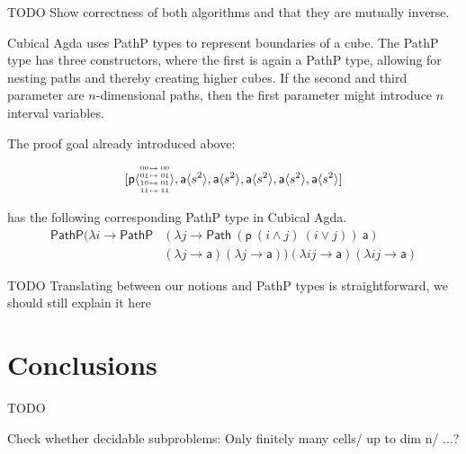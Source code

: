 \documentclass{llncs}
\makeatletter
\newcommand{\continuation}{??}
\newenvironment{examplecontd}[1]
{
  \renewcommand{\continuation}{\ref{#1}}\expcont[continued]
}
{\endexpcont}
\newcommand{\todo}[1]{
  \begin{tcolorbox}
    TODO {#1} 
  \end{tcolorbox}
}
\newcommand{\mlist}[1]{[ {#1} ]}
\newcommand{\smap}[1]{s^{{#1}}}
\newcommand{\cont}[2]{\ensuremath{ \ifthenelse{\equal{#2}{}}{#1}{{#1}\langle{#2}\rangle}} }
\newcommand{\cset}[1]{\ensuremath{\mathsf{{#1}}}}
\newcommand{\substfour}[4]{\tiny
  \arraycolsep=.4pt\def\arraystretch{1}
  \begin{array}{ll}
    00 &\mapsto {#1} \\
    01 &\mapsto {#2} \\
    10 &\mapsto {#3} \\
    11 &\mapsto {#4} 
  \end{array}
}
\makeatother
\begin{document}
\todo{Show correctness of both algorithms and that they are mutually inverse.}

Cubical Agda uses PathP types to represent boundaries of a cube. The PathP type
has three constructors, where the first is again a PathP type, allowing for
nesting paths and thereby creating higher cubes. If the second and third
parameter are $n$-dimensional paths, then the first parameter might introduce
$n$ interval variables.


\begin{examplecontd}{exp:sndsphere}
  
The proof goal already introduced above:

$$\mlist{ \cont{\cset{p}}{\substfour{00}{01}{01}{11}} ,
  \cont{\cset{a}}{\smap{2}} , \cont{\cset{a}}{\smap{2}} ,
  \cont{\cset{a}}{\smap{2}} , \cont{\cset{a}}{\smap{2}} ,
  \cont{\cset{a}}{\smap{2}}}$$

has the following corresponding PathP type in Cubical Agda.
  \begin{align*}
    \mathsf{PathP} (\lambda i \to \mathsf{PathP} &(\lambda j \to  \mathsf{Path} \ (\cset{p} \ (i \wedge
                                                   j) \ (i \vee j))\ \cset{a})\\
                                                 &(\lambda j \to \cset{a}) (\lambda j \to \cset{a}))
                                                   (\lambda i j \to \cset{a}) (\lambda i j \to \cset{a})
  \end{align*}
\end{examplecontd}

\todo{Translating between our notions and PathP types is straightforward, we
  should still explain it here}






\section{Conclusions}
\label{sec:conclusions}

\todo{}

Check whether decidable subproblems: Only finitely many cells/ up to dim n/ ...?
\end{document}
